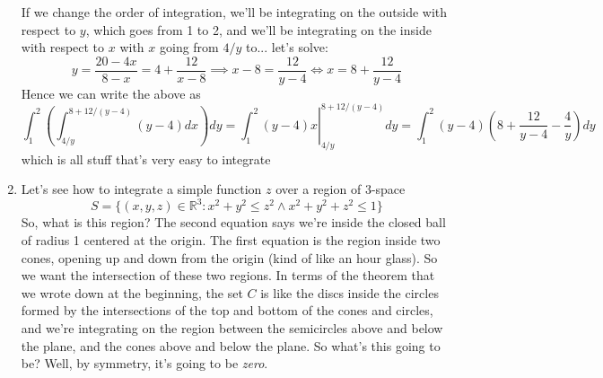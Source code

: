\documentclass{article}
\newcommand{\reals}[0]{\mathbb{R}}
\begin{document}
\begin{enumerate}
  If we change the order of integration, we'll be integrating on the outside with respect to \(y\), which goes from 1 to 2, and we'll be integrating on the inside with respect to \(x\) with \(x\) going from \(4/y\) to... let's solve:
  \begin{equation}
    y = \frac{20 - 4x}{8 - x} = 4 + \frac{12}{x - 8} \implies x - 8 = \frac{12}{y - 4} \iff x = 8 + \frac{12}{y - 4}
  \end{equation}
  Hence we can write the above as
  \begin{equation}
    \int_1^2\left(\int_{4/y}^{8 + 12/(y - 4)}(y - 4)dx\right)dy = \left.\int_1^2(y - 4)x\right|_{4/y}^{8 + 12/(y - 4)}dy = \int_1^2(y - 4)\left(8 + \frac{12}{y - 4} - \frac{4}{y}\right)dy
  \end{equation}
  which is all stuff that's very easy to integrate

  \item Let's see how to integrate a simple function \(z\) over a region of \(3\)-space
  \begin{equation}
    S = \{(x, y, z) \in \reals^3 : x^2 + y^2 \leq z^2 \land x^2 + y^2 + z^2 \leq 1\}
  \end{equation}
  So, what is this region? The second equation says we're inside the closed ball of radius 1 centered at the origin. The first equation is the region inside two  cones, opening up and down from the origin (kind of like an hour glass). So we want the intersection of these two regions. In terms of the theorem that we wrote down at the beginning, the set \(C\) is like the discs inside the circles formed by the intersections of the top and bottom of the cones and circles, and we're integrating on the region between the semicircles above and below the plane, and the cones above and below the plane. So what's this going to be? Well, by symmetry, it's going to be \textit{zero}.


\end{enumerate}
\end{document}
